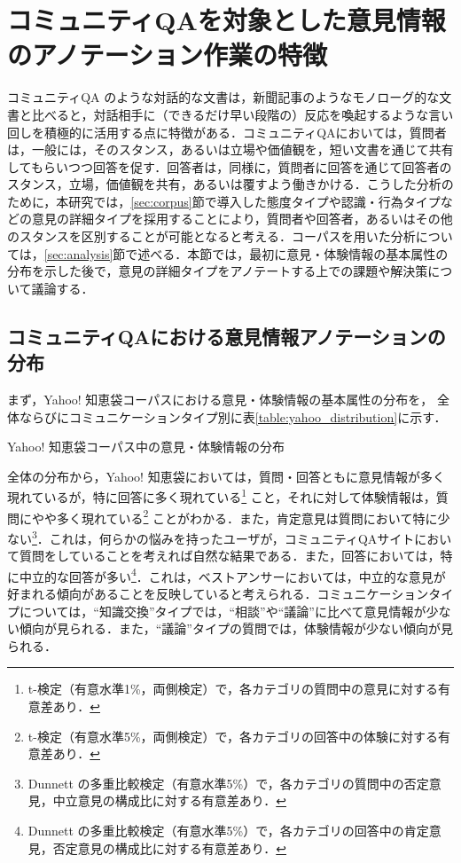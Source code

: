\documentclass[japanese]{jnlp_1.4}
\begin{document}
\section{コミュニティQAを対象とした意見情報のアノテーション作業の特徴}
\label{sec:communityQA_annotation}

コミュニティQA のような対話的な文書は，新聞記事のようなモノローグ的な文書と比べると，対話相手に（できるだけ早い段階の）反応を喚起するような言い回しを積極的に活用する点に特徴がある．コミュニティQAにおいては，質問者は，一般には，そのスタンス，あるいは立場や価値観を，短い文書を通じて共有してもらいつつ回答を促す．回答者は，同様に，質問者に回答を通じて回答者のスタンス，立場，価値観を共有，あるいは覆すよう働きかける．こうした分析のために，本研究では，\ref{sec:corpus}節で導入した態度タイプ\cite{martin2005}や認識・行為タイプなどの意見の詳細タイプを採用することにより，質問者や回答者，あるいはその他のスタンスを区別することが可能となると考える．コーパスを用いた分析については，\ref{sec:analysis}節で述べる．本節では，最初に意見・体験情報の基本属性の分布を示した後で，意見の詳細タイプをアノテートする上での課題や解決策について議論する．


\subsection{コミュニティQAにおける意見情報アノテーションの分布}
\label{subsec:distribution}

まず，Yahoo! 知恵袋コーパスにおける意見・体験情報の基本属性の分布を，
全体ならびにコミュニケーションタイプ\cite{adamic2008www,kabutoya2008dbsj}別に表\ref{table:yahoo_distribution}に示す．

\begin{table}[b]
\caption{Yahoo! 知恵袋コーパス中の意見・体験情報の分布}
\label{table:yahoo_distribution}

\end{table}

全体の分布から，Yahoo! 知恵袋においては，質問・回答ともに意見情報が多く現れているが，特に回答に多く現れている\footnote{t-検定（有意水準1\%，両側検定）で，各カテゴリの質問中の意見に対する有意差あり．} こと，それに対して体験情報は，質問にやや多く現れている\footnote{t-検定（有意水準5\%，両側検定）で，各カテゴリの回答中の体験に対する有意差あり．} ことがわかる．また，肯定意見は質問において特に少ない\footnote{Dunnett の多重比較検定（有意水準5\%）で，各カテゴリの質問中の否定意見，中立意見の構成比に対する有意差あり．}．これは，何らかの悩みを持ったユーザが，コミュニティQAサイトにおいて質問をしていることを考えれば自然な結果である．また，回答においては，特に中立的な回答が多い\footnote{Dunnett の多重比較検定（有意水準5\%）で，各カテゴリの回答中の肯定意見，否定意見の構成比に対する有意差あり．}．これは，ベストアンサーにおいては，中立的な意見が好まれる傾向があることを反映していると考えられる．コミュニケーションタイプについては，``知識交換''タイプでは，``相談''や``議論''に比べて意見情報が少ない傾向が見られる．また，``議論''タイプの質問では，体験情報が少ない傾向が見られる．
\end{document}
